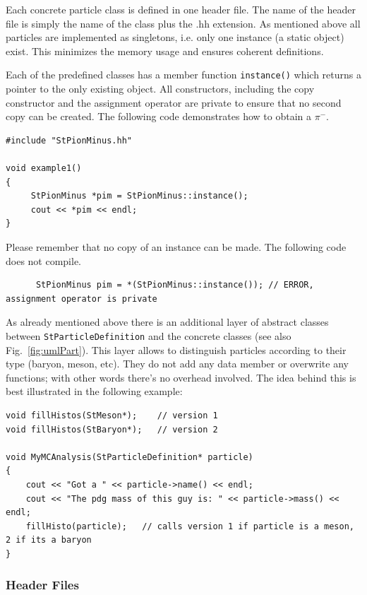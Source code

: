 \documentclass[twoside]{article}
\newcommand{\comp}[1]{\texttt{#1}}%
\begin{document}
Each concrete
particle class is defined in one header file. The name of the header file is simply
the name of the class plus the .hh extension.
As mentioned above all particles are implemented as singletons, i.e. only one instance
(a static object) exist. This minimizes the memory usage and ensures coherent definitions.

Each of the predefined classes has a member function \comp{instance()} which returns
a pointer to the only existing object. All constructors, including the copy constructor
and the assignment operator are private to ensure that no second copy can be created.
The following code demonstrates how to obtain a $\pi^-$.

{\footnotesize
\begin{verbatim}
#include "StPionMinus.hh"

void example1()
{
     StPionMinus *pim = StPionMinus::instance();
     cout << *pim << endl; 
}
\end{verbatim}
}

Please remember that no copy of an instance can be made. The following code
does not compile.

{\footnotesize
\begin{verbatim}
      StPionMinus pim = *(StPionMinus::instance()); // ERROR, assignment operator is private 
\end{verbatim}
}

As already mentioned above there is an additional layer of abstract classes
between \comp{StParticleDefinition} and the concrete classes (see also Fig.~\ref{fig:umlPart}).
This layer allows to distinguish particles according to their type (baryon, meson, etc).
They do not add any data member or overwrite any functions; with other words there's no overhead involved.
The idea behind this is best illustrated in the following example: 

{\footnotesize
\begin{verbatim}
void fillHistos(StMeson*);    // version 1 
void fillHistos(StBaryon*);   // version 2 

void MyMCAnalysis(StParticleDefinition* particle) 
{ 
    cout << "Got a " << particle->name() << endl; 
    cout << "The pdg mass of this guy is: " << particle->mass() << endl; 
    fillHisto(particle);   // calls version 1 if particle is a meson, 2 if its a baryon 
} 
\end{verbatim}
}

\subsubsection{Header Files}
\end{document}
